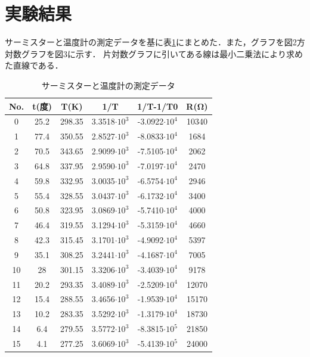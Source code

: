 \documentclass[a4paper,11pt]{ltjsarticle}
\begin{document}
\section{実験結果}
サーミスターと温度計の測定データを基に表\ref{tab:result}にまとめた．また，グラフを図2方対数グラフを図3に示す．
片対数グラフに引いてある線は最小二乗法により求めた直線である．
\begin{table}[H]
  \centering
  \caption{サーミスターと温度計の測定データ}
  \label{tab:result}
  \begin{tabular}{|c|c|c|c|c|c|}
    \hline
    No. & t(度) & T(K)   & 1/T                 & 1/T-1/T0             & R(Ω)  \\
    \hline
    0   & 25.2 & 298.35 & 3.3518$\cdot 10 ^3$ & -3.0922$\cdot 10 ^4$ & 10340 \\\hline
    1   & 77.4 & 350.55 & 2.8527$\cdot 10 ^3$ & -8.0833$\cdot 10 ^4$ & 1684  \\\hline
    2   & 70.5 & 343.65 & 2.9099$\cdot 10 ^3$ & -7.5105$\cdot 10 ^4$ & 2062  \\\hline
    3   & 64.8 & 337.95 & 2.9590$\cdot 10 ^3$ & -7.0197$\cdot 10 ^4$ & 2470  \\\hline
    4   & 59.8 & 332.95 & 3.0035$\cdot 10 ^3$ & -6.5754$\cdot 10 ^4$ & 2946  \\\hline
    5   & 55.4 & 328.55 & 3.0437$\cdot 10 ^3$ & -6.1732$\cdot 10 ^4$ & 3400  \\\hline
    6   & 50.8 & 323.95 & 3.0869$\cdot 10 ^3$ & -5.7410$\cdot 10 ^4$ & 4000  \\\hline
    7   & 46.4 & 319.55 & 3.1294$\cdot 10 ^3$ & -5.3159$\cdot 10 ^4$ & 4660  \\\hline
    8   & 42.3 & 315.45 & 3.1701$\cdot 10 ^3$ & -4.9092$\cdot 10 ^4$ & 5397  \\\hline
    9   & 35.1 & 308.25 & 3.2441$\cdot 10 ^3$ & -4.1687$\cdot 10 ^4$ & 7005  \\\hline
    10  & 28   & 301.15 & 3.3206$\cdot 10 ^3$ & -3.4039$\cdot 10 ^4$ & 9178  \\\hline
    11  & 20.2 & 293.35 & 3.4089$\cdot 10 ^3$ & -2.5209$\cdot 10 ^4$ & 12070 \\\hline
    12  & 15.4 & 288.55 & 3.4656$\cdot 10 ^3$ & -1.9539$\cdot 10 ^4$ & 15170 \\\hline
    13  & 10.2 & 283.35 & 3.5292$\cdot 10 ^3$ & -1.3179$\cdot 10 ^4$ & 18730 \\\hline
    14  & 6.4  & 279.55 & 3.5772$\cdot 10 ^3$ & -8.3815$\cdot 10 ^5$ & 21850 \\\hline
    15  & 4.1  & 277.25 & 3.6069$\cdot 10 ^3$ & -5.4139$\cdot 10 ^5$ & 24000 \\\hline
  \end{tabular}
\end{table}
\end{document}
